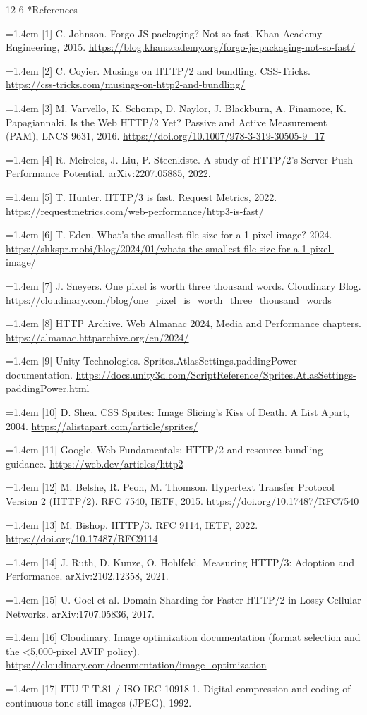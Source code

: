\documentclass[3p,twocolumn]{elsarticle}
\makeatletter
\renewcommand\section{\@startsection{section}{1}{\z@}%
           {12\p@ \@plus 3\p@ \@minus 4\p@}%
           {6\p@ \@plus 2\p@ \@minus 2\p@}%
           {\normalsize\bfseries\boldmath}}
\newcommand{\reference}[1]{\par\noindent\hangindent=1.4em\hangafter=1 #1\par\vspace{2pt}}
\makeatother
\begin{document}
\section*{References}
{\small
\reference{[1] C. Johnson. Forgo JS packaging? Not so fast. Khan Academy Engineering, 2015. \url{https://blog.khanacademy.org/forgo-js-packaging-not-so-fast/}}
\reference{[2] C. Coyier. Musings on HTTP/2 and bundling. CSS-Tricks. \url{https://css-tricks.com/musings-on-http2-and-bundling/}}
\reference{[3] M. Varvello, K. Schomp, D. Naylor, J. Blackburn, A. Finamore, K. Papagiannaki. Is the Web HTTP/2 Yet? Passive and Active Measurement (PAM), LNCS 9631, 2016. \url{https://doi.org/10.1007/978-3-319-30505-9_17}}
\reference{[4] R. Meireles, J. Liu, P. Steenkiste. A study of HTTP/2's Server Push Performance Potential. arXiv:2207.05885, 2022.}
\reference{[5] T. Hunter. HTTP/3 is fast. Request Metrics, 2022. \url{https://requestmetrics.com/web-performance/http3-is-fast/}}
\reference{[6] T. Eden. What's the smallest file size for a 1 pixel image? 2024. \url{https://shkspr.mobi/blog/2024/01/whats-the-smallest-file-size-for-a-1-pixel-image/}}
\reference{[7] J. Sneyers. One pixel is worth three thousand words. Cloudinary Blog. \url{https://cloudinary.com/blog/one_pixel_is_worth_three_thousand_words}}
\reference{[8] HTTP Archive. Web Almanac 2024, Media and Performance chapters. \url{https://almanac.httparchive.org/en/2024/}}
\reference{[9] Unity Technologies. Sprites.AtlasSettings.paddingPower documentation. \url{https://docs.unity3d.com/ScriptReference/Sprites.AtlasSettings-paddingPower.html}}
\reference{[10] D. Shea. CSS Sprites: Image Slicing's Kiss of Death. A List Apart, 2004. \url{https://alistapart.com/article/sprites/}}
\reference{[11] Google. Web Fundamentals: HTTP/2 and resource bundling guidance. \url{https://web.dev/articles/http2}}
\reference{[12] M. Belshe, R. Peon, M. Thomson. Hypertext Transfer Protocol Version 2 (HTTP/2). RFC 7540, IETF, 2015. \url{https://doi.org/10.17487/RFC7540}}
\reference{[13] M. Bishop. HTTP/3. RFC 9114, IETF, 2022. \url{https://doi.org/10.17487/RFC9114}}
\reference{[14] J. Ruth, D. Kunze, O. Hohlfeld. Measuring HTTP/3: Adoption and Performance. arXiv:2102.12358, 2021.}
\reference{[15] U. Goel et al. Domain-Sharding for Faster HTTP/2 in Lossy Cellular Networks. arXiv:1707.05836, 2017.}
\reference{[16] Cloudinary. Image optimization documentation (format selection and the <5,000-pixel AVIF policy). \url{https://cloudinary.com/documentation/image_optimization}}
\reference{[17] ITU-T T.81 / ISO IEC 10918-1. Digital compression and coding of continuous-tone still images (JPEG), 1992.}
}
\end{document}
